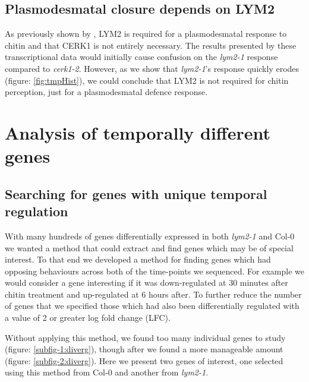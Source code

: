 \documentclass[../main.tex]{subfiles}
\begin{document}
\subsection{Plasmodesmatal closure depends on LYM2}
\label{sec:plasm-clos-depends}

As previously shown by \citet{Faulkner2013}, LYM2 is required for a
plasmodesmatal response to chitin and that CERK1 is not entirely necessary. The
results presented by these transcriptional data would initially cause confusion
on the \textit{lym2-1} response compared to \textit{cerk1-2}. However, as we
show that \textit{lym2-1}'s response quickly erodes (figure: \ref{fig:tmpHist}),
we could conclude that LYM2 is not required for chitin perception, just for a
plasmodesmatal defence response.

\clearpage

\section{Analysis of temporally different genes}
\label{sec:tempexpress}

\subsection{Searching for genes with unique temporal regulation}
\label{sec:col-0-textitlym2}

With many hundreds of genes differentially expressed in both \textit{lym2-1}
and Col-0 we wanted a method that could extract and find genes which may be of
special interest. To that end we developed a method for finding genes which had
opposing behaviours across both of the time-points we sequenced. For example we
would consider a gene interesting if it was down-regulated at 30 minutes after
chitin treatment and up-regulated at 6 hours after. To further reduce the number
of genes that we specified those which had also been differentially regulated
with a value of 2 or greater log fold change (LFC).

Without applying this method, we found too many individual genes to study
(figure: \ref{subfig-1:diverg}), though after we found a more manageable amount
(figure: \ref{subfig-2:diverg}). Here we present two genes of interest, one
selected using this method from Col-0 and another from \textit{lym2-1}.
\end{document}
